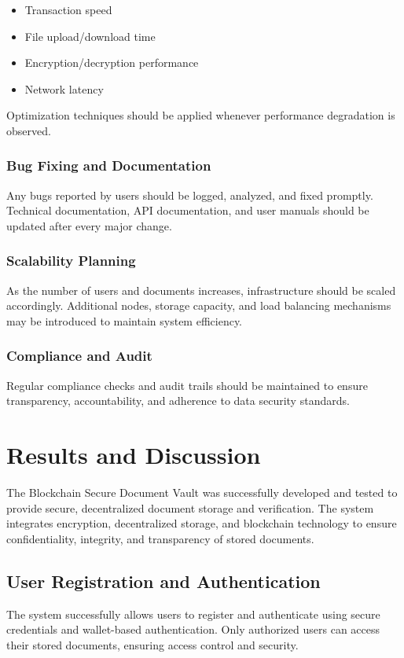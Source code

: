 \documentclass[12pt]{article}
\begin{document}
\begin{itemize}
\begin{itemize}
    \item Transaction speed
    \item File upload/download time
    \item Encryption/decryption performance
    \item Network latency
\end{itemize}

Optimization techniques should be applied whenever performance degradation is observed.

\subsubsection{Bug Fixing and Documentation}
Any bugs reported by users should be logged, analyzed, and fixed promptly. Technical documentation, API documentation, and user manuals should be updated after every major change.

\subsubsection{Scalability Planning}
As the number of users and documents increases, infrastructure should be scaled accordingly. Additional nodes, storage capacity, and load balancing mechanisms may be introduced to maintain system efficiency.

\subsubsection{Compliance and Audit}
Regular compliance checks and audit trails should be maintained to ensure transparency, accountability, and adherence to data security standards.

\end{itemize}
\newpage

\section{Results and Discussion}

The Blockchain Secure Document Vault was successfully developed and tested to provide secure, decentralized document storage and verification. The system integrates encryption, decentralized storage, and blockchain technology to ensure confidentiality, integrity, and transparency of stored documents.

\subsection{User Registration and Authentication}
The system successfully allows users to register and authenticate using secure credentials and wallet-based authentication. Only authorized users can access their stored documents, ensuring access control and security.
\end{document}
